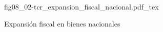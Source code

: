 \begin{figure}[h]
\centering
\def\svgwidth{0.5\textwidth}
{fig08_02-tcr_expansion_fiscal_nacional.pdf_tex}
\caption{Expansión fiscal en bienes nacionales}
\label{fig08_02-tcr_expansion_fiscal_nacional}
\end{figure}
